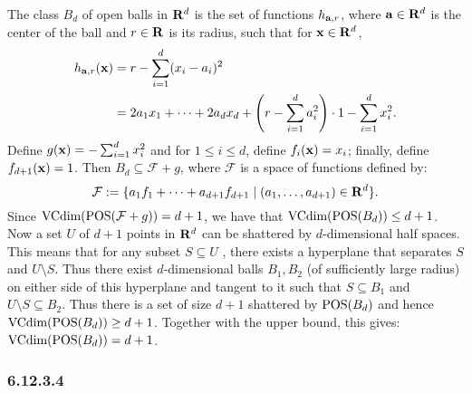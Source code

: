 The class $B_d$ of open balls in $\mathbf{R}^d$ is the set of functions $h_{\mathbf{a}, r}$,
where $\mathbf{a} \in \mathbf{R}^d$ is the center of the ball and $r \in \mathbf{R}$ is its radius, 
such that for $\mathbf{x} \in \mathbf{R}^d$, 
\begin{align*}
    h_{\mathbf{a}, r} (\mathbf{x}) & = r - \sum_{i = 1}^d (x_i - a_i)^2 \\
    & = 2 a_1 x_1 + \cdots + 2 a_d x_d + 
    \left ( r - \sum_{i = 1}^d a_i^2 \right ) \cdot 1 - \sum_{i = 1}^d x_i^2.
\end{align*}
Define $g(\mathbf{x}) = - \sum_{i = 1}^d x_i^2$ and for $1 \leq i \leq d$, define
$f_i(\mathbf{x}) = x_i$; finally, define $f_{d + 1}(\mathbf{x}) = 1$. Then 
$B_d \subseteq \mathcal{F} + g$, where $\mathcal{F}$ is a space of functions defined by:
\[
    \mathcal{F} := \{a_1 f_1 + \cdots + a_{d + 1} f_{d + 1} \mid 
        (a_1, \ldots, a_{d + 1}) \in \mathbf{R}^d\}.
\] 
Since $\text{VCdim} ( \operatorname{POS} (\mathcal{F} + g)) = d + 1$, we have that 
$\text{VCdim} (\operatorname{POS} (B_d)) \leq d + 1$. Now a set $U$ of $d + 1$ points in $\mathbf{R}^d$ can be 
shattered by $d$-dimensional half spaces. This means that for any subset 
$S \subseteq U$ , there exists a hyperplane that separates $S$ and $U \setminus S$. 
Thus there exist $d$-dimensional balls $B_1, B_2$ (of sufficiently large radius) 
on either side of this hyperplane and tangent to it such that $S \subseteq B_1$ 
and $U \setminus S \subseteq B_2$. Thus there is a set of size $d + 1$ shattered 
by $\operatorname{POS} (B_d)$ and hence $\text{VCdim} (\operatorname{POS} (B_d)) \geq  d + 1$. Together with 
the upper bound, this gives:  $\text{VCdim} (\operatorname{POS} (B_d)) =  d + 1$.      

\subsubsection*{6.12.3.4}

